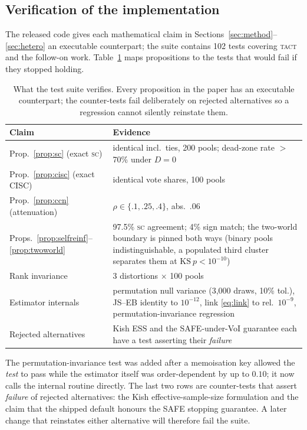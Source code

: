 \documentclass{article}
\newcommand{\SC}{\textsc{sc}}
\newcommand{\TACT}{\textsc{tact}}
\begin{document}
\subsection{Verification of the implementation}\label{sec:tests}
The released code gives each mathematical claim in
Sections~\ref{sec:method}--\ref{sec:hetero} an executable counterpart; the suite
contains 102 tests covering \TACT{} and the
follow-on work. Table~\ref{tab:tests}
maps propositions to the tests that would fail if they stopped holding.

\begin{table}[t]
\centering
\caption{What the test suite verifies. Every proposition in the paper has an
executable counterpart; the counter-tests fail deliberately on rejected
alternatives so a regression cannot silently reinstate them.}
\label{tab:tests}
\setlength{\tabcolsep}{3.4pt}
\begin{tabular}{p{5.2cm} p{9.2cm}}
\toprule
Claim & Evidence \\
\midrule
Prop.~\ref{prop:sc} (exact \SC) & identical incl.\ ties, 200 pools; dead-zone rate $>$70\% under $D{=}0$ \\
Prop.~\ref{prop:cisc} (exact CISC) & identical vote shares, 100 pools \\
Prop.~\ref{prop:ccn} (attenuation) & $\rho\in\{.1,.25,.4\}$, abs.\ $.06$ \\
Props.~\ref{prop:selfreinf}--\ref{prop:twoworld} & 97.5\% \SC{} agreement; 4\% sign match; the two-world boundary is pinned both ways (binary pools indistinguishable, a populated third cluster separates them at $\mathrm{KS}\ p<10^{-10}$) \\
Rank invariance & 3 distortions $\times$ 100 pools \\
Estimator internals & permutation null variance (3{,}000 draws, 10\% tol.), JS--EB identity to $10^{-12}$, link \eqref{eq:link} to rel.\ $10^{-9}$, permutation-invariance regression \\
Rejected alternatives & Kish ESS and the SAFE-under-VoI guarantee each have a test asserting their \emph{failure} \\
\bottomrule
\end{tabular}
\end{table}

The permutation-invariance test was added after a memoisation key allowed the
\emph{test} to pass while the
estimator itself was order-dependent by up to $0.10$; it now calls the internal
routine directly. The last two rows are counter-tests that assert
\emph{failure} of rejected alternatives: the Kish effective-sample-size
formulation and the claim that the shipped default honours the SAFE stopping
guarantee. A later change that reinstates either alternative will therefore fail
the suite.
\end{document}

